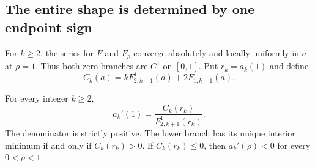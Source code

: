 \subsection{The entire shape is determined by one endpoint sign}

For $k\geq2$, the series for $F$ and $F_\rho$ converge absolutely and
locally uniformly in $a$ at $\rho=1$. Thus both zero branches are $C^1$
on $[0,1]$. Put $r_k=a_k(1)$ and define
\begin{equation}\label{lershape:eq:Ck}
 C_k(a)=kF_{2,k-1}^{1}(a)+2F_{1,k-1}^{1}(a).
\end{equation}

\begin{theorem}
\label{lershape:thm:criterion}
For every integer $k\geq2$,
\begin{equation}\label{lershape:eq:endpoint-velocity}
 a_k'(1)=\frac{C_k(r_k)}{F_{2,k+1}^{1}(r_k)}.
\end{equation}
The denominator is strictly positive. The lower branch has its unique
interior minimum if and only if $C_k(r_k)>0$. If $C_k(r_k)\leq0$,
then $a_k'(\rho)<0$ for every $0<\rho<1$.
\end{theorem}

